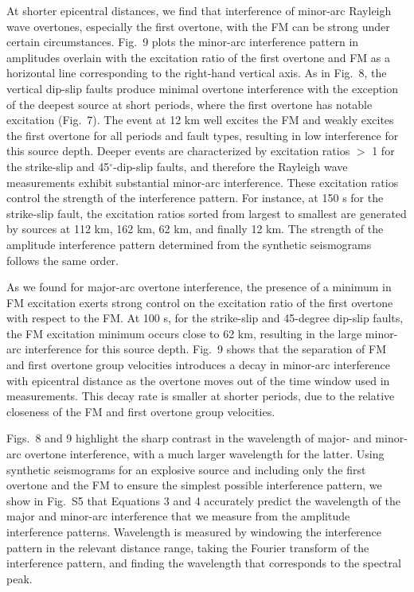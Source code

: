 \documentclass[extra,mreferee]{gji}
\begin{document}
At shorter epicentral distances, we find that  interference of minor-arc Rayleigh wave overtones, especially the first overtone, with the FM can be strong under certain circumstances. Fig.\ 9 plots the minor-arc interference pattern in amplitudes overlain with the excitation ratio of the first overtone and FM as a horizontal line corresponding to the right-hand vertical axis. As in Fig.\ 8, the vertical dip-slip faults produce minimal overtone interference with the exception of the deepest source at short periods, where the first overtone has notable excitation (Fig.\ 7). The event at 12 km well excites the FM and weakly excites the first overtone for all periods and fault types, resulting in low interference for this source depth. Deeper events are characterized by excitation ratios $>$ 1 for the strike-slip and 45$^\circ$-dip-slip faults, and therefore the Rayleigh wave measurements exhibit substantial minor-arc interference. These excitation ratios control the strength of the interference pattern. For instance, at 150 s for the strike-slip fault, the excitation ratios sorted from largest to smallest are generated by sources at 112 km, 162 km, 62 km, and finally 12 km. The strength of the amplitude interference pattern determined from the synthetic seismograms follows the same order. 

As we found for major-arc overtone interference, the presence of a minimum in FM excitation exerts strong control on the excitation ratio of the first overtone with respect to the FM. At 100 s, for the strike-slip and 45-degree dip-slip faults, the FM excitation minimum occurs close to 62 km, resulting in the large minor-arc interference for this source depth. Fig.\ 9 shows that the separation of FM and first overtone group velocities introduces a decay in minor-arc interference with epicentral distance as the overtone moves out of the time window used in measurements. This decay rate is smaller at shorter periods, due to the relative closeness of the FM and first overtone group velocities.

Figs.\ 8 and 9 highlight the sharp contrast in the wavelength of major- and minor-arc overtone interference, with a much larger wavelength for the latter. Using synthetic seismograms for an explosive source and including only the first overtone and the FM to ensure the simplest possible interference pattern, we show in Fig.\ S5 that Equations 3 and 4 accurately predict the wavelength of the major and minor-arc interference that we measure from the amplitude interference patterns. Wavelength is measured by windowing the interference pattern in the relevant distance range, taking the Fourier transform of the interference pattern, and finding the wavelength that corresponds to the spectral peak. 
\end{document}
